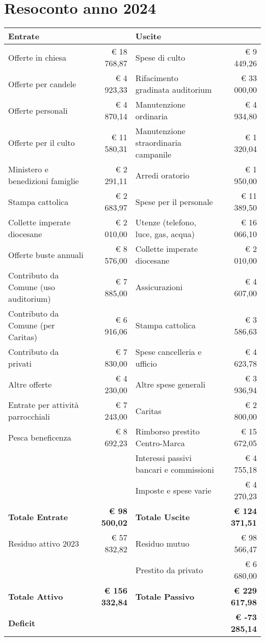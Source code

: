 \section{Resoconto anno 2024}

{\small
\begin{longtable}
{@{}p{}r@{\hspace{1em}}p{}r@{}}
\toprule
\multicolumn{2}{l}{\textbf{Entrate}} & \multicolumn{2}{l}{\textbf{Uscite}} \\
\midrule
Offerte in chiesa & € 18 768,87
& Spese di culto & € 9 449,26 \\
Offerte per candele & € 4 923,33
& Rifacimento gradinata auditorium & € 33 000,00 \\
Offerte personali & € 4 870,14
& Manutenzione ordinaria & € 4 934,80 \\
Offerte per il culto & € 11 580,31
& Manutenzione straordinaria campanile & € 1 320,04 \\
Ministero e benedizioni famiglie & € 2 291,11
& Arredi oratorio & € 1 950,00 \\
Stampa cattolica & € 2 683,97
& Spese per il personale & € 11 389,50 \\
Collette imperate diocesane & € 2 010,00
& Utenze (telefono, luce, gas, acqua) & € 16 066,10 \\
Offerte buste annuali & € 8 576,00
& Collette imperate diocesane & € 2 010,00 \\
Contributo da Comune (uso auditorium) & € 7 885,00
& Assicurazioni & € 4 607,00 \\
Contributo da Comune (per Caritas) & € 6 916,06
& Stampa cattolica & € 3 586,63 \\
Contributo da privati & € 7 830,00
& Spese cancelleria e ufficio & € 4 623,78 \\
Altre offerte & € 4 230,00
& Altre spese generali & € 3 936,94 \\
Entrate per attività parrocchiali & € 7 243,00
& Caritas & € 2 800,00 \\
Pesca beneficenza & € 8 692,23
& Rimborso prestito Centro-Marca & € 15 672,05 \\
&
& Interessi passivi bancari e commissioni & € 4 755,18 \\
&
& Imposte e spese varie & € 4 270,23 \\
\midrule
\textbf{Totale Entrate} & \textbf{€ 98 500,02} & \textbf{Totale Uscite} & \textbf{€ 124 371,51} \\
\midrule
Residuo attivo 2023 & € 57 832,82
& Residuo mutuo & € 98 566,47 \\
& & Prestito da privato & € 6 680,00 \\
\textbf{Totale Attivo} & \textbf{€ 156 332,84} & \textbf{Totale Passivo} & \textbf{€ 229 617,98} \\
\midrule
\multicolumn{2}{l}{\textbf{Deficit}} & & {\textbf{€ -73 285,14}} \\
\bottomrule
\end{longtable}

}
